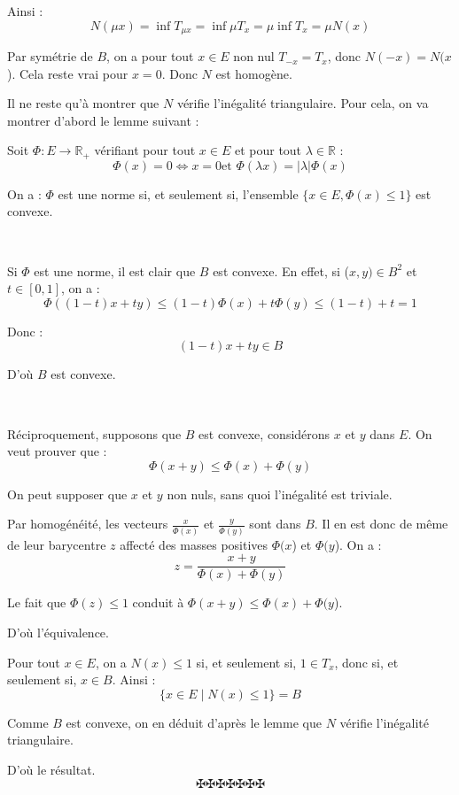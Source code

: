 Ainsi :
\[ N (\mu x) = \inf T_{\mu x} = \inf \mu T_x = \mu \inf T_x = \mu N (x) \]


Par sym{\'e}trie de $B$, on a pour tout $x \in E$ non nul $T_{- x} = T_x$,
donc $N (- x) = N (x$). Cela reste vrai pour $x = 0$. Donc $N$ est
homog{\`e}ne.

Il ne reste qu'{\`a} montrer que $N$ v{\'e}rifie l'in{\'e}galit{\'e}
triangulaire. Pour cela, on va montrer d'abord le lemme suivant :


Soit $\Phi : E \to \mathbb{R}_+$ v{\'e}rifiant pour tout $x \in E$ et pour
tout $\lambda \in \mathbb{R}$ :
\[ \Phi (x) = 0 \Longleftrightarrow x = 0 \text{et } \Phi (\lambda x) = |
   \lambda | \Phi (x) \]


On a : $\Phi$ est une norme si, et seulement si, l'ensemble $\{x \in E, \Phi
(x) \leq 1\}$ est convexe.

\


Si $\Phi$ est une norme, il est clair que $B$ est convexe. En effet, si ($x,
y) \in B^2$ et $t \in [0, 1]$, on a :
\[ \Phi ((1 - t) x + ty) \leq (1 - t) \Phi (x) + t \Phi (y) \leq (1 - t) + t =
   1 \]


Donc :
\[ (1 - t) x + ty \in B \]


D'o{\`u} $B$ est convexe.

\

R{\'e}ciproquement, supposons que $B$ est convexe, consid{\'e}rons $x$ et $y$
dans $E$. On veut prouver que :
\[ \Phi (x + y) \leq \Phi (x) + \Phi (y) \]


On peut supposer que $x$ et $y$ non nuls, sans quoi l'in{\'e}galit{\'e} est
triviale.

Par homog{\'e}n{\'e}it{\'e}, les vecteurs $\frac{x}{\Phi (x)}$ et
$\frac{y}{\Phi (y)}$ sont dans $B$. Il en est donc de m{\^e}me de leur
barycentre $z$ affect{\'e} des masses positives $\Phi (x$) et $\Phi (y$). On a
:
\[ z = \frac{x + y}{\Phi (x) + \Phi (y)} \]


Le fait que $\Phi (z) \leq 1$ conduit {\`a} $\Phi (x + y) \leq \Phi (x) + \Phi
(y$).

D'o{\`u} l'{\'e}quivalence.

Pour tout $x \in E$, on a $N (x) \leq 1$ si, et seulement si, $1 \in T_x$,
donc si, et seulement si, $x \in B$. Ainsi :
\[ \{x \in E \mid N (x) \leq 1\}= B \]


Comme $B$ est convexe, on en d{\'e}duit d'apr{\`e}s le lemme que $N$
v{\'e}rifie l'in{\'e}galit{\'e} triangulaire.

D'o{\`u} le r{\'e}sultat.
\[ \maltese \maltese \maltese \maltese \maltese \maltese \maltese \]
